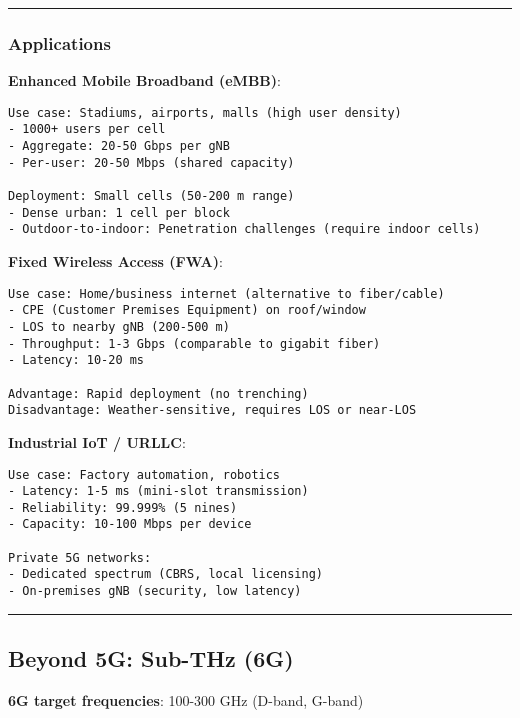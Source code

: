 \begin{center}\rule{0.5\linewidth}{0.5pt}\end{center}

\subsubsection{Applications}\label{applications}

\textbf{Enhanced Mobile Broadband (eMBB)}:

\begin{verbatim}
Use case: Stadiums, airports, malls (high user density)
- 1000+ users per cell
- Aggregate: 20-50 Gbps per gNB
- Per-user: 20-50 Mbps (shared capacity)

Deployment: Small cells (50-200 m range)
- Dense urban: 1 cell per block
- Outdoor-to-indoor: Penetration challenges (require indoor cells)
\end{verbatim}

\textbf{Fixed Wireless Access (FWA)}:

\begin{verbatim}
Use case: Home/business internet (alternative to fiber/cable)
- CPE (Customer Premises Equipment) on roof/window
- LOS to nearby gNB (200-500 m)
- Throughput: 1-3 Gbps (comparable to gigabit fiber)
- Latency: 10-20 ms

Advantage: Rapid deployment (no trenching)
Disadvantage: Weather-sensitive, requires LOS or near-LOS
\end{verbatim}

\textbf{Industrial IoT / URLLC}:

\begin{verbatim}
Use case: Factory automation, robotics
- Latency: 1-5 ms (mini-slot transmission)
- Reliability: 99.999% (5 nines)
- Capacity: 10-100 Mbps per device

Private 5G networks:
- Dedicated spectrum (CBRS, local licensing)
- On-premises gNB (security, low latency)
\end{verbatim}

\begin{center}\rule{0.5\linewidth}{0.5pt}\end{center}

\subsection{\texorpdfstring{ Beyond 5G: Sub-THz
(6G)}{ Beyond 5G: Sub-THz (6G)}}\label{beyond-5g-sub-thz-6g}

\textbf{6G target frequencies}: 100-300 GHz (D-band, G-band)


